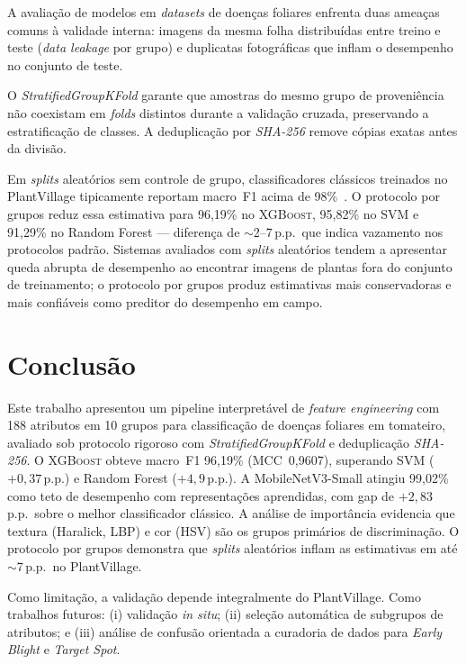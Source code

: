 \documentclass[kdmile,a4paper]{kdmile}
\providecommand{\gls}[1]{\textnormal{\textsc{#1}}}
\begin{document}
A avaliação de modelos em \textit{datasets} de doenças foliares enfrenta duas
ameaças comuns à validade interna: imagens da mesma folha distribuídas entre
treino e teste (\textit{data leakage} por grupo) e duplicatas fotográficas que
inflam o desempenho no conjunto de teste.

O \textit{StratifiedGroupKFold} garante que amostras do mesmo grupo de
proveniência não coexistam em \textit{folds} distintos durante a validação
cruzada, preservando a estratificação de classes. A deduplicação por
\textit{SHA-256} remove cópias exatas antes da divisão.

Em \textit{splits} aleatórios sem controle de grupo, classificadores clássicos
treinados no PlantVillage tipicamente reportam macro~F1 acima de
98\%~\cite{mohanty2016deep,zimmermann2025}. O protocolo por grupos reduz essa
estimativa para 96,19\% no \gls{XGBoost}, 95,82\% no SVM e 91,29\% no Random
Forest --- diferença de $\sim$2--7\,p.p.\ que indica vazamento nos protocolos
padrão. Sistemas avaliados com \textit{splits} aleatórios tendem a apresentar
queda abrupta de desempenho ao encontrar imagens de plantas fora do conjunto de
treinamento; o protocolo por grupos produz estimativas mais conservadoras e mais
confiáveis como preditor do desempenho em campo.

\section{Conclusão}

Este trabalho apresentou um pipeline interpretável de \textit{feature
engineering} com 188 atributos em 10 grupos para classificação de doenças
foliares em tomateiro, avaliado sob protocolo rigoroso com
\textit{StratifiedGroupKFold} e deduplicação \textit{SHA-256}. O \gls{XGBoost}
obteve macro~F1 96,19\% (MCC~0,9607), superando SVM ($+0{,}37$\,p.p.) e Random
Forest ($+4{,}9$\,p.p.). A MobileNetV3-Small atingiu 99,02\% como teto de
desempenho com representações aprendidas, com gap de $+2{,}83$\,p.p.\ sobre o
melhor classificador clássico. A análise de importância evidencia que textura
(Haralick, LBP) e cor (HSV) são os grupos primários de discriminação. O
protocolo por grupos demonstra que \textit{splits} aleatórios inflam as
estimativas em até $\sim$7\,p.p.\ no PlantVillage.

Como limitação, a validação depende integralmente do PlantVillage. Como
trabalhos futuros: (i) validação \textit{in situ}; (ii) seleção automática de
subgrupos de atributos; e (iii) análise de confusão orientada a curadoria de
dados para \textit{Early Blight} e \textit{Target Spot}.




\begin{received}
\end{received}
\end{document}
